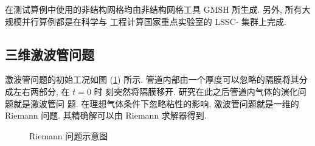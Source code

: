 在测试算例中使用的非结构网格均由非结构网格工具 GMSH
\cite{Geuzaine2009} 所生成. 另外, 所有大规模并行算例都是在科学与
工程计算国家重点实验室的 LSSC- 集群上完成.

\subsection{三维激波管问题}
\label{sec:sod-shock-tube-test-case}

激波管问题的初始工况如图 (\ref{fig:sock-tube-illustration}) 所示.
管道内部由一个厚度可以忽略的隔膜将其分成左右两部分, 在 $t = 0$ 时
刻突然将隔膜移开. 研究在此之后管道内气体的演化问题就是激波管问
题. 在理想气体条件下忽略粘性的影响, 激波管问题就是一维的 Riemann
问题. 其精确解可以由 Riemann 求解器得到.

\begin{figure}[htbp]
  \centering
  
  \caption{Riemann 问题示意图}
  \label{fig:sock-tube-illustration}
\end{figure}


